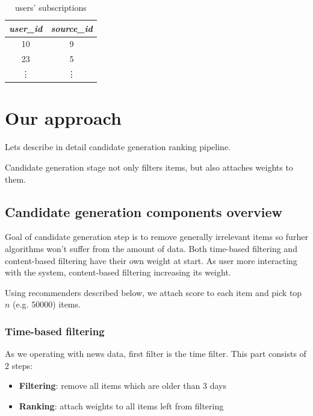 \documentclass{article}
\begin{document}
\begin{table}[h]
    \centering
    \begin{tabular}{cc}
        \toprule

        \emph{user\_id} & \emph{source\_id} \\\midrule

        10 & 9  \\
        23 & 5  \\
        \vdots & \vdots  \\\bottomrule

    \end{tabular}

    \caption{users' subscriptions}
    \label{tab:subscriptions}
\end{table}


\newpage
\section{Our approach}
\label{sec:approach}

Lets describe in detail candidate generation ranking pipeline.

Candidate generation stage not only filters items, but also attaches weights to them.

\subsection{Candidate generation components overview}

Goal of candidate generation step is to remove generally irrelevant items so furher algorithms won't suffer from the amount of data. Both time-based filtering and content-based filtering have their own weight at start. As user more interacting with the system, content-based filtering increasing its weight.

Using recommenders described below, we attach score to each item and pick top $n$ (e.g. $50 000$) items.

\subsubsection{Time-based filtering}

As we operating with news data, first filter is the time filter. This part consists of 2 steps:

\begin{itemize}
    \item \textbf{Filtering}: remove all items which are older than 3 days
    \item \textbf{Ranking}: attach weights to all items left from filtering
\end{itemize}
\end{document}
